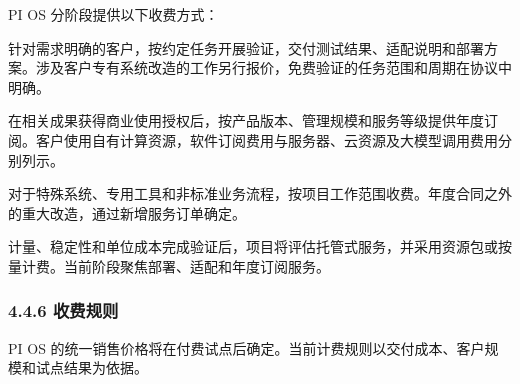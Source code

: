 PI OS 分阶段提供以下收费方式：


针对需求明确的客户，按约定任务开展验证，交付测试结果、适配说明和部署方案。涉及客户专有系统改造的工作另行报价，免费验证的任务范围和周期在协议中明确。


在相关成果获得商业使用授权后，按产品版本、管理规模和服务等级提供年度订阅。客户使用自有计算资源，软件订阅费用与服务器、云资源及大模型调用费用分别列示。


对于特殊系统、专用工具和非标准业务流程，按项目工作范围收费。年度合同之外的重大改造，通过新增服务订单确定。


计量、稳定性和单位成本完成验证后，项目将评估托管式服务，并采用资源包或按量计费。当前阶段聚焦部署、适配和年度订阅服务。

\subsubsection{4.4.6 收费规则}\label{ux6536ux8d39ux89c4ux5219}

PI OS 的统一销售价格将在付费试点后确定。当前计费规则以交付成本、客户规模和试点结果为依据。

